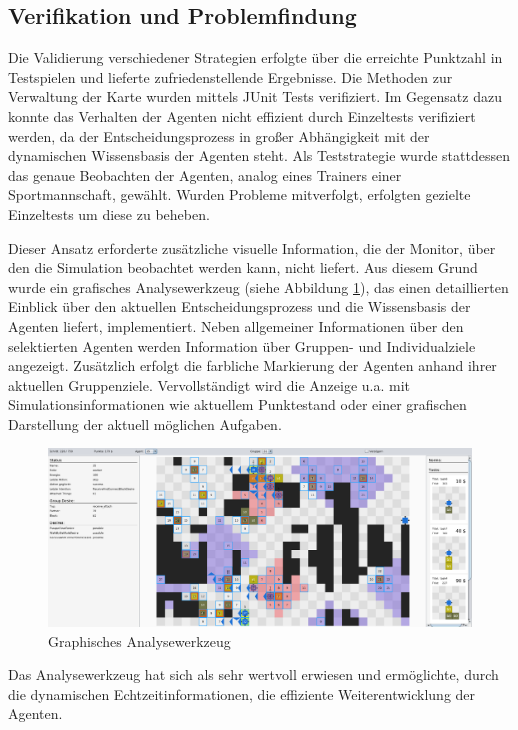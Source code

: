 \documentclass[runningheads]{llncs}
\begin{document}
\subsection{Verifikation und Problemfindung}\label{verifikation}
Die Validierung verschiedener Strategien erfolgte über die erreichte Punktzahl in Testspielen und lieferte zufriedenstellende Ergebnisse. Die Methoden zur Verwaltung der Karte wurden mittels JUnit Tests \cite{JUnit} verifiziert. Im Gegensatz dazu konnte das Verhalten der Agenten nicht effizient durch Einzeltests verifiziert werden, da der Entscheidungsprozess in großer Abhängigkeit mit der dynamischen Wissensbasis der Agenten steht.
Als Teststrategie wurde stattdessen das genaue Beobachten der Agenten, analog eines Trainers einer Sportmannschaft, gewählt. Wurden Probleme mitverfolgt, erfolgten gezielte Einzeltests um diese zu beheben.

Dieser Ansatz erforderte zusätzliche visuelle Information, die der Monitor, über den die Simulation beobachtet werden kann, nicht liefert. Aus diesem Grund wurde ein grafisches Analysewerkzeug (siehe Abbildung \ref{debugger}), das einen detaillierten Einblick über den aktuellen Entscheidungsprozess und die Wissensbasis der Agenten liefert, implementiert. Neben allgemeiner Informationen über den selektierten Agenten werden Information über Gruppen- und Individualziele angezeigt. Zusätzlich erfolgt die farbliche Markierung der Agenten anhand ihrer aktuellen Gruppenziele.
Vervollständigt wird die Anzeige u.a. mit Simulationsinformationen wie aktuellem Punktestand oder einer grafischen Darstellung der aktuell möglichen Aufgaben.


\begin{figure}
\includegraphics[scale=0.091]{./Referenzen/Debugger2.png}
\caption{Graphisches Analysewerkzeug}
\label{debugger}
\end{figure}

Das Analysewerkzeug hat sich als sehr wertvoll erwiesen und ermöglichte, durch die dynamischen Echtzeitinformationen, die effiziente Weiterentwicklung der Agenten.
\end{document}
